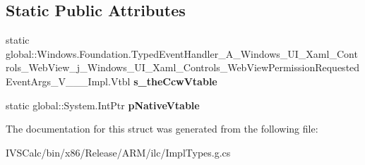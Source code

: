 \subsection*{Static Public Attributes}
\begin{DoxyCompactItemize}
\item 
\mbox{\label{struct_windows_1_1_foundation_1_1_typed_event_handler___a___windows___u_i___xaml___controls___we02730dfc82c56beef290621040cade95_a1d2640c2635d794f5e630f47f3152fcb}} 
static global\+::\+Windows.\+Foundation.\+Typed\+Event\+Handler\+\_\+\+A\+\_\+\+Windows\+\_\+\+U\+I\+\_\+\+Xaml\+\_\+\+Controls\+\_\+\+Web\+View\+\_\+j\+\_\+\+Windows\+\_\+\+U\+I\+\_\+\+Xaml\+\_\+\+Controls\+\_\+\+Web\+View\+Permission\+Requested\+Event\+Args\+\_\+\+V\+\_\+\+\_\+\+\_\+\+Impl.\+Vtbl {\bfseries s\+\_\+the\+Ccw\+Vtable}
\item 
\mbox{\label{struct_windows_1_1_foundation_1_1_typed_event_handler___a___windows___u_i___xaml___controls___we02730dfc82c56beef290621040cade95_a59186c60b8caebf8b1e0b200510d9ceb}} 
static global\+::\+System.\+Int\+Ptr {\bfseries p\+Native\+Vtable}
\end{DoxyCompactItemize}


The documentation for this struct was generated from the following file\+:\begin{DoxyCompactItemize}
\item 
I\+V\+S\+Calc/bin/x86/\+Release/\+A\+R\+M/ilc/Impl\+Types.\+g.\+cs\end{DoxyCompactItemize}
